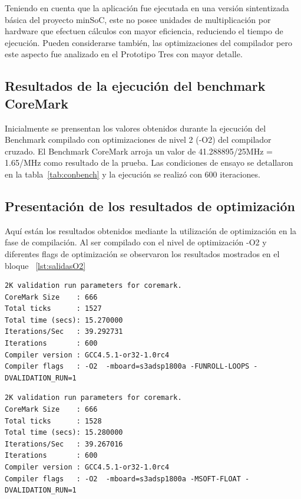 		Teniendo en cuenta que la aplicación fue ejecutada en una versión sintentizada básica del proyecto minSoC, este no posee unidades de multiplicación
		por hardware que efectuen cálculos con mayor eficiencia, reduciendo el tiempo de ejecución. Pueden considerarse también, las optimizaciones del
		compilador pero este aspecto fue analizado en el Prototipo Tres con mayor detalle. 	

		\subsection{Resultados de la ejecución del benchmark CoreMark}
		
Inicialmente se prensentan los valores obtenidos durante la ejecución del Benchmark compilado con optimizaciones de nivel 2 (-O2) del
compilador cruzado. El Benchmark CoreMark arroja un valor de  41.288895/25MHz = 1.65/MHz como resultado de la prueba. Las condiciones de ensayo se
detallaron en la tabla~\ref{tab:conbench} y la ejecución se realizó con 600 iteraciones. 


	\subsection {Presentación de los resultados de optimización} 
	
Aquí están los resultados obtenidos mediante la utilización de optimización en la fase de compilación. Al ser compilado con el nivel de optimización
-O2 y diferentes flags de optimización se observaron los resultados mostrados en el bloque ~\ref{lst:salidasO2}

\begin{lstlisting}[frame=single,caption={Optimización nivel -O2 - Flags activos : -FUNROLL-LOOPS },label={lst:salidasO2},breaklines]
2K validation run parameters for coremark.
CoreMark Size    : 666
Total ticks      : 1527
Total time (secs): 15.270000
Iterations/Sec   : 39.292731
Iterations       : 600
Compiler version : GCC4.5.1-or32-1.0rc4
Compiler flags   : -O2  -mboard=s3adsp1800a -FUNROLL-LOOPS -DVALIDATION_RUN=1  
\end{lstlisting}

\begin{lstlisting}[frame=single,caption={Optimización nivel -O2 - Flags activos : -MSOFT-FLOAT},label={lst:salidas},breaklines]
2K validation run parameters for coremark.
CoreMark Size    : 666
Total ticks      : 1528
Total time (secs): 15.280000
Iterations/Sec   : 39.267016
Iterations       : 600
Compiler version : GCC4.5.1-or32-1.0rc4
Compiler flags   : -O2  -mboard=s3adsp1800a -MSOFT-FLOAT -DVALIDATION_RUN=1  
\end{lstlisting}

